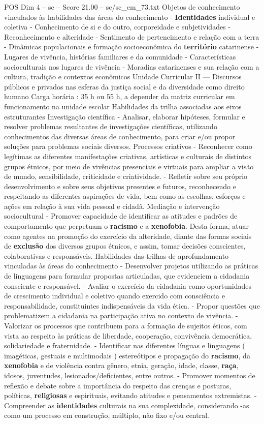 \begin{textsample}{POS Dim 4 – sc – Score 21.00 – sc/sc\_em\_73.txt}
Objetos de conhecimento vinculados às habilidades das áreas do conhecimento - \textbf{Identidades} individual e coletiva - Conhecimento de si e do outro, corporeidade e subjetividades - Reconhecimento e alteridade - Sentimento de pertencimento e relação com a terra - Dinâmicas populacionais e formação socioeconômica do \textbf{território} catarinense - Lugares de vivência, histórias familiares e da comunidade - Características socioculturais nos lugares de vivência - Moradias catarinenses e sua relação com a cultura, tradição e contextos econômicos Unidade Curricular II — Discursos públicos e privados nas esferas da justiça social e da diversidade como direito humano Carga horária : 35 h ou 55 h, a depender da matriz curricular em funcionamento na unidade escolar Habilidades da trilha associadas aos eixos estruturantes Investigação científica - Analisar, elaborar hipóteses, formular e resolver problemas resultantes de investigações científicas, utilizando conhecimentos das diversas áreas de conhecimento, para criar e/ou propor soluções para problemas sociais diversos.
Processos criativos - Reconhecer como legítimas as diferentes manifestações criativas, artísticas e culturais de distintos grupos étnicos, por meio de vivências presenciais e virtuais para ampliar a visão de mundo, sensibilidade, criticidade e criatividade. - Refletir sobre seu próprio desenvolvimento e sobre seus objetivos presentes e futuros, reconhecendo e respeitando as diferentes aspirações de vida, bem como as escolhas, esforços e ações em relação à sua vida pessoal e cidadã.
Mediação e intervenção sociocultural - Promover capacidade de identificar as atitudes e padrões de comportamento que perpetuam o \textbf{racismo} e a \textbf{xenofobia}.
Desta forma, atuar como agentes na promoção do exercício da alteridade, diante das formas sociais de \textbf{exclusão} dos diversos grupos étnicos, e assim, tomar decisões conscientes, colaborativas e responsáveis.
Habilidades das trilhas de aprofundamento vinculadas às áreas do conhecimento - Desenvolver projetos utilizando as práticas de linguagens para formular propostas articuladas, que evidenciem a cidadania consciente e responsável. - Avaliar o exercício da cidadania como oportunidades de crescimento individual e coletivo quando exercido com consciência e responsabilidade, constituintes indispensáveis da vida ética. - Propor questões que problematizem a cidadania na participação ativa no contexto de vivência. - Valorizar os processos que contribuem para a formação de sujeitos éticos, com vista ao respeito às práticas de liberdade, cooperação, convivência democrática, solidariedade e fraternidade. - Identificar nas diferentes línguas e linguagens ( imagéticas, gestuais e multimodais ) estereótipos e propagação do \textbf{racismo}, da \textbf{xenofobia} e de violência contra gênero, etnia, geração, idade, classe, \textbf{raça}, idosos, juventudes, lesionados/deficientes, entre outros. - Promover momentos de reflexão e debate sobre a importância do respeito das crenças e posturas, políticas, \textbf{religiosas} e espirituais, evitando atitudes e pensamentos extremistas. - Compreender as \textbf{identidades} culturais na sua complexidade, considerando -as como um processo em construção, múltiplo, não fixo e/ou central.

\end{textsample}
